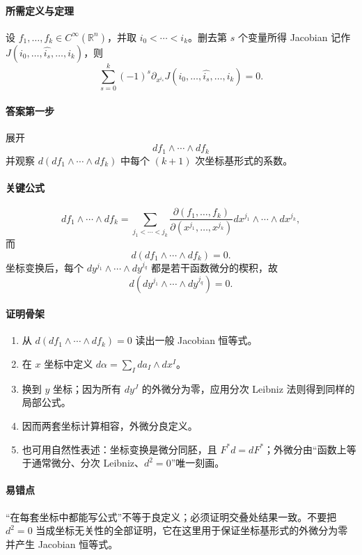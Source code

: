 \documentclass[12pt,a4paper]{ctexart}
\newcommand{\R}{\mathbb R}
\begin{document}
\paragraph{所需定义与定理}
设 $f_1,\ldots,f_k\in C^\infty(\R^n)$，并取 $i_0<\cdots<i_k$。删去第 $s$ 个变量所得 Jacobian 记作 $J(i_0,\ldots,\widehat{i_s},\ldots,i_k)$，则
\[
  \sum_{s=0}^k(-1)^s
  \partial_{x^{i_s}}
  J(i_0,\ldots,\widehat{i_s},\ldots,i_k)=0.
\]

\paragraph{答案第一步}
展开
\[
  df_1\wedge\cdots\wedge df_k
\]
并观察 $d(df_1\wedge\cdots\wedge df_k)$ 中每个 $(k+1)$ 次坐标基形式的系数。

\paragraph{关键公式}
\[
  df_1\wedge\cdots\wedge df_k
  =
  \sum_{j_1<\cdots<j_k}
  \frac{\partial(f_1,\ldots,f_k)}
  {\partial(x^{j_1},\ldots,x^{j_k})}
  dx^{j_1}\wedge\cdots\wedge dx^{j_k},
\]
而
\[
  d(df_1\wedge\cdots\wedge df_k)=0.
\]
坐标变换后，每个 $dy^{j_1}\wedge\cdots\wedge dy^{j_q}$ 都是若干函数微分的楔积，故
\[
  d(dy^{j_1}\wedge\cdots\wedge dy^{j_q})=0.
\]

\paragraph{证明骨架}
\begin{enumerate}
  \item 从 $d(df_1\wedge\cdots\wedge df_k)=0$ 读出一般 Jacobian 恒等式。
  \item 在 $x$ 坐标中定义 $d\alpha=\sum_I da_I\wedge dx^I$。
  \item 换到 $y$ 坐标；因为所有 $dy^J$ 的外微分为零，应用分次 Leibniz 法则得到同样的局部公式。
  \item 因而两套坐标计算相容，外微分良定义。
  \item 也可用自然性表述：坐标变换是微分同胚，且 $F^*d=dF^*$；外微分由“函数上等于通常微分、分次 Leibniz、$d^2=0$”唯一刻画。
\end{enumerate}

\paragraph{易错点}
“在每套坐标中都能写公式”不等于良定义；必须证明交叠处结果一致。不要把 $d^2=0$ 当成坐标无关性的全部证明，它在这里用于保证坐标基形式的外微分为零并产生 Jacobian 恒等式。
\end{document}
